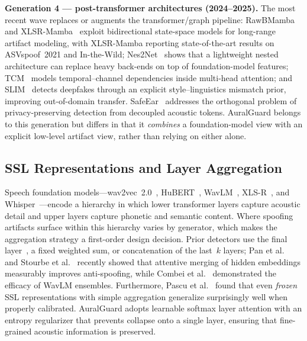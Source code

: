 \textbf{Generation 4 --- post-transformer architectures (2024--2025).} The most recent
wave replaces or augments the transformer/graph pipeline: RawBMamba~\cite{chen2024rawbmamba}
and XLSR-Mamba~\cite{xiao2025xlsrmamba} exploit bidirectional state-space models for
long-range artifact modeling, with XLSR-Mamba reporting state-of-the-art results on
ASVspoof~2021 and In-the-Wild; Nes2Net~\cite{liu2025nes2net} shows that a lightweight
nested architecture can replace heavy back-ends on top of foundation-model features;
TCM~\cite{truong2024tcm} models temporal--channel dependencies inside multi-head
attention; and SLIM~\cite{zhu2024slim} detects deepfakes through an explicit
style--linguistics mismatch prior, improving out-of-domain transfer. SafeEar~\cite{li2024safeear}
addresses the orthogonal problem of privacy-preserving detection from decoupled
acoustic tokens. AuralGuard belongs to this generation but differs in that it
\emph{combines} a foundation-model view with an explicit low-level artifact view,
rather than relying on either alone.

\subsection{SSL Representations and Layer Aggregation}
\label{ssec:related-ssl}

Speech foundation models---wav2vec~2.0~\cite{baevski2020wav2vec},
HuBERT~\cite{hsu2021hubert}, WavLM~\cite{chen2022wavlm}, XLS-R~\cite{babu2022xlsr},
and Whisper~\cite{radford2023whisper}---encode a hierarchy in which lower transformer
layers capture acoustic detail and upper layers capture phonetic and semantic content.
Where spoofing artifacts surface within this hierarchy varies by generator, which
makes the aggregation strategy a first-order design decision. Prior detectors use the
final layer~\cite{tak2022automatic}, a fixed weighted sum, or concatenation of the
last~$k$ layers; Pan et al.~\cite{pan2024attentive} and Stourbe et al.~\cite{stourbe2024exploring} recently showed that attentive
merging of hidden embeddings measurably improves anti-spoofing, while Combei et al.~\cite{combei2024wavlm} demonstrated the efficacy of WavLM ensembles. Furthermore, Pascu et
al.~\cite{pascu2024calibrated} found that even \emph{frozen} SSL representations with
simple aggregation generalize surprisingly well when properly calibrated. AuralGuard
adopts learnable softmax layer attention with an entropy regularizer that prevents
collapse onto a single layer, ensuring that fine-grained acoustic information is preserved.

